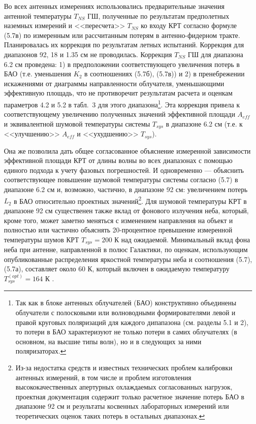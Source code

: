 Во всех антенных измерениях использовались предварительные значения антенной температуры $T_{NS}$
ГШ, полученные по результатам предполетных наземных измерений и <<пересчета>> $T_{NS}$ ко входу КРТ
согласно формуле (5.7в) по измеренным или рассчитанным потерям  \cite{RAUH} в антенно-фидерном
тракте. Планировалась их коррекция по результатам летных испытаний. Коррекция для диапазонов 92, 18
и 1.35 см не проводилась. Коррекция $T_{NS}$ ГШ для диапазона 6.2 см проведена: 1) в предположении
соответствующего увеличения потерь в БАО (т.е. уменьшения $K_2$ в соотношениях (5.7б), (5.7в)) и 2)
в пренебрежении искажениями от диаграммы направленности облучателя, уменьшающими эффективную
площадь, что не противоречит результатам расчета  \cite{} и оценкам параметров 4.2 и 5.2 в табл.~3
для этого диапазона\footnote {Так как в блоке антенных облучателей (БАО) конструктивно объединены
облучатели с полосковыми или волноводными формирователями левой и правой круговых поляризаций для
каждого дипапазона (см. разделы 5.1 и  2), то потери в БАО характеризуют не только потери в самих
облучателях (в основном, на высшие типы волн), но и в следующих за ними поляризаторах. }. Эта
коррекция привела к соответствующему увеличению полученных значений эффективной площади $A_{eff}$ и
эквивалентной шумовой температуры системы $T_{sys}$ в диапазоне 6.2 см (т.е. к <<улучшению>>
$A_{eff}$ и <<ухудшению>> $T_{sys}$).

Она же  позволила дать общее согласованное объяснение измеренной зависимости эффективной площади КРТ
от длины волны во всех диапазонах с помощью единого подхода к учету фазовых погрешностей. И
одновременно --- объяснить соответствующее повышение шумовой температуры системы согласно (5.7)  в
диапазоне 6.2 см и, возможно, частично, в диапазоне 92 см: увеличением потерь $L_2$ в БАО
относительно проектных значений\footnote {Из-за недостатка средств  и известных технических проблем
калибровки антенных измерений, в том числе и проблем изготовления высококачественных апертурных
охлаждаемых согласованных нагрузок, проектная документация содержит только расчетное значение потерь
БАО в диапазоне 92 см и результаты косвенных лабораторных измерений  или теоретических оценок таких
потерь в остальных диапазонах.}. Для шумовой температуры КРТ в диапазоне 92 см существенен также
вклад от фонового излучения неба, который, кроме того, может заметно меняться с изменением
направления на объект и полностью или частично объяснять 20-процентное превышение измеренной
температуры шумов КРТ $T_{sys} = 200$ К над ожидаемой. Минимальный вклад фона неба при антенне,
направленной в полюс Галактики, по оценкам, использующим опубликованные распределения яркостной
температуры неба и соотношения (5.7), (5.7а), составляет около 60 К, который включен в ожидаемую
температуру $T_{sys}^{(opt)} = 164 $ К \cite{RAUH}.

